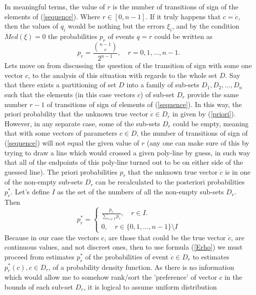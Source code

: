 \documentclass[11pt,a4paper]{article}
\numberwithin{equation}{subsection}
\begin{document}
In meaningful terms, the value of $r$ is the number of transitions of sign of the elements of  (\ref{sequence}). Where $r \in [0,n-1]$. If it truly happens that $c=\dot{c}$, then the values of $q_{i}$ would be nothing but the errors $\xi_{i}$, and by the condition $Med(\xi)=0$ the probabilities $p_{r}$ of events $q = r$ could be written as
\begin{equation}
p_{r}= \frac{\binom {n-1}r}{2^{n-1}}, \quad r = 0,1,\dots,n-1. \label{priori}
\end{equation}
Lets move on from discussing the question of the transition of sign with some one vector $c$, to the analysis of this situation with regards to the whole set $D$. Say that there exists a partitioning of set $D$ into a family of sub-sets $D_{1},D_{2},\dots,D_{n}$ such that the elements (in this case vectors $c$) of sub-set $D_{r}$ provide the same number $r-1$ of transitions of sign of elements of (\ref{sequence}). In this way, the priori probability that the unknown true vector $\dot{c} \in D_{r}$ in given by (\ref{priori}). However, in any separate case, some of the sub-sets $D_{r}$ could be empty, meaning  that with some vectors of parameters $c \in D$, the number of transitions of sign of (\ref{sequence}) will not equal the given value of $r$ (any one can make sure of this by trying to draw a line which would crossed a given poly-line by guess, in such way that all of the endpoints of this poly-line turned out to be on either side of the guessed line). The priori probabilities $p_{r}$ that the unknown true vector $\dot{c}$ is in one of the non-empty sub-sets $D_{r}$ can be recalculated to the posteriori probabilities $p_{r}^{*}$. Let's define $I$ as the set of the numbers of all the non-empty sub-sets $D_{r}$. Then
\begin{equation}
p_{r}^{*}= 
\begin{cases} 
		\frac{p_{r}}{\sum\limits_{s \in I}p_{s}}, \quad r \in I.\\
		0, \quad r \in \{ 0,1,\dots,n-1 \} \setminus I
\end{cases}
\end{equation}
Because in our case the vectors $c$, are those that could be the true vector $\dot{c}$, are continuous values, and not discreet ones, then to use formula (\ref{Erho}) we must proceed from estimates $p_{r}^{*}$ of the probabilities of event $\dot{c} \in D_{r}$ to estimates $p_{r}^{*}(c), c \in D_{r}$, of a probability density function. As there is no information  which would allow me to somehow rank/sort the 'preference' of vector $c$ in the bounds of each sub-set $D_{r}$, it is logical to assume uniform distribution
\end{document}
